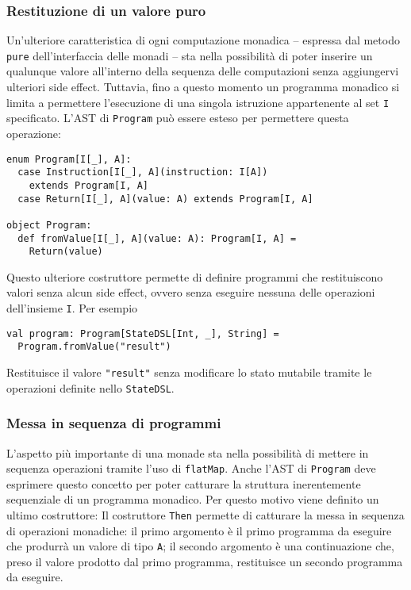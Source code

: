 \subsubsection{Restituzione di un valore puro}
Un'ulteriore caratteristica di ogni computazione monadica -- espressa dal metodo \lstinline{pure} dell'interfaccia delle monadi -- sta nella possibilità di poter inserire un qualunque valore all'interno della sequenza delle computazioni senza aggiungervi ulteriori side effect.
Tuttavia, fino a questo momento un programma monadico si limita a permettere l'esecuzione di una singola istruzione appartenente al set \lstinline{I} specificato. L'AST di \lstinline{Program} può essere esteso per permettere questa operazione:
\begin{lstlisting}[language=scala3]
enum Program[I[_], A]:
  case Instruction[I[_], A](instruction: I[A])
    extends Program[I, A]
  case Return[I[_], A](value: A) extends Program[I, A]

object Program:
  def fromValue[I[_], A](value: A): Program[I, A] =
    Return(value)
\end{lstlisting}

Questo ulteriore costruttore permette di definire programmi che restituiscono valori senza alcun side effect, ovvero senza eseguire nessuna delle operazioni dell'insieme \lstinline{I}. Per esempio
\begin{lstlisting}[language=scala3]
val program: Program[StateDSL[Int, _], String] =
  Program.fromValue("result")
\end{lstlisting}
Restituisce il valore \lstinline{"result"} senza modificare lo stato mutabile tramite le operazioni definite nello \lstinline{StateDSL}.

\subsubsection{Messa in sequenza di programmi}
L'aspetto più importante di una monade sta nella possibilità di mettere in sequenza operazioni tramite l'uso di \lstinline{flatMap}.
Anche l'AST di \lstinline{Program} deve esprimere questo concetto per poter catturare la struttura inerentemente sequenziale di un programma monadico. Per questo motivo viene definito un ultimo costruttore:
Il costruttore \lstinline{Then} permette di catturare la messa in sequenza di operazioni monadiche: il primo argomento è il primo programma da eseguire che produrrà un valore di tipo \lstinline{A}; il secondo argomento è una continuazione che, preso il valore prodotto dal primo programma, restituisce un secondo programma da eseguire.

